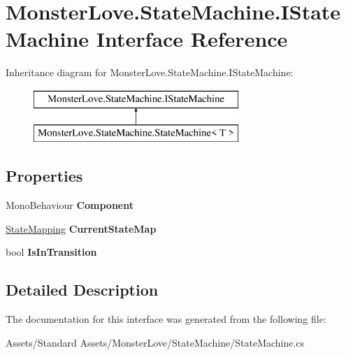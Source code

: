 \hypertarget{interface_monster_love_1_1_state_machine_1_1_i_state_machine}{}\section{Monster\+Love.\+State\+Machine.\+I\+State\+Machine Interface Reference}
\label{interface_monster_love_1_1_state_machine_1_1_i_state_machine}


 


Inheritance diagram for Monster\+Love.\+State\+Machine.\+I\+State\+Machine\+:\begin{figure}[H]
\begin{center}
\leavevmode
\includegraphics[height=2.000000cm]{interface_monster_love_1_1_state_machine_1_1_i_state_machine}
\end{center}
\end{figure}
\subsection*{Properties}
\begin{DoxyCompactItemize}
\item 
Mono\+Behaviour {\bfseries Component}\hypertarget{interface_monster_love_1_1_state_machine_1_1_i_state_machine_aa699aef47a8b037d556c1657b0e3ae16}{}\label{interface_monster_love_1_1_state_machine_1_1_i_state_machine_aa699aef47a8b037d556c1657b0e3ae16}

\item 
\hyperlink{class_monster_love_1_1_state_machine_1_1_state_mapping}{State\+Mapping} {\bfseries Current\+State\+Map}\hypertarget{interface_monster_love_1_1_state_machine_1_1_i_state_machine_a256a3f6bf52ab415282aa5ae8a0cf59f}{}\label{interface_monster_love_1_1_state_machine_1_1_i_state_machine_a256a3f6bf52ab415282aa5ae8a0cf59f}

\item 
bool {\bfseries Is\+In\+Transition}\hypertarget{interface_monster_love_1_1_state_machine_1_1_i_state_machine_abe11256d7a5b77a6e5a009dbbdf6dca9}{}\label{interface_monster_love_1_1_state_machine_1_1_i_state_machine_abe11256d7a5b77a6e5a009dbbdf6dca9}

\end{DoxyCompactItemize}


\subsection{Detailed Description}




The documentation for this interface was generated from the following file\+:\begin{DoxyCompactItemize}
\item 
Assets/\+Standard Assets/\+Monster\+Love/\+State\+Machine/State\+Machine.\+cs\end{DoxyCompactItemize}

